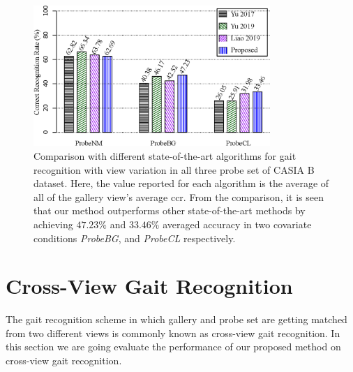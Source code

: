 \begin{figure}
	\centering
	\includegraphics[width = 0.8\textwidth]{figures/comp_casia_b_with_view.eps}
	\caption [Comparison with different state-of-the-art algorithms for gait recognition with view variation in all three probe set of CASIA B dataset]
	{Comparison with different state-of-the-art algorithms for gait recognition with view variation in all three probe set of CASIA B dataset. Here, the value reported for each algorithm is the average of all of the gallery view's average \gls{ccr}. From the comparison, it is seen that our method outperforms other state-of-the-art methods by achieving $47.23\%$ and $33.46\%$ averaged accuracy in two covariate conditions \textit{ProbeBG}, and \textit{ProbeCL} respectively.   \label{fig:comp_casia_b_with_view}
	}
	
\end{figure}




\section{Cross-View Gait Recognition} \label{sec:cross_view}
The gait recognition scheme in which gallery and probe set are getting matched from two different views is commonly known as cross-view gait recognition. In this section we are going evaluate the performance of our proposed method on cross-view gait recognition. 
 


